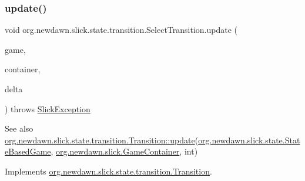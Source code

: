 \mbox{\label{classorg_1_1newdawn_1_1slick_1_1state_1_1transition_1_1_select_transition_a17304499adede77a5323e747aee6bcdd}} 
\subsubsection{\texorpdfstring{update()}{update()}}
{\footnotesize\ttfamily void org.\+newdawn.\+slick.\+state.\+transition.\+Select\+Transition.\+update (\begin{DoxyParamCaption}\item[{\mbox{\hyperlink{classorg_1_1newdawn_1_1slick_1_1state_1_1_state_based_game}{State\+Based\+Game}}}]{game,  }\item[{\mbox{\hyperlink{classorg_1_1newdawn_1_1slick_1_1_game_container}{Game\+Container}}}]{container,  }\item[{int}]{delta }\end{DoxyParamCaption}) throws \mbox{\hyperlink{classorg_1_1newdawn_1_1slick_1_1_slick_exception}{Slick\+Exception}}\hspace{0.3cm}{\ttfamily [inline]}}

\begin{DoxySeeAlso}{See also}
\mbox{\hyperlink{interfaceorg_1_1newdawn_1_1slick_1_1state_1_1transition_1_1_transition_a9be3072f6e2423e3d0a451a419d1d518}{org.\+newdawn.\+slick.\+state.\+transition.\+Transition\+::update}}(\mbox{\hyperlink{classorg_1_1newdawn_1_1slick_1_1state_1_1_state_based_game}{org.\+newdawn.\+slick.\+state.\+State\+Based\+Game}}, \mbox{\hyperlink{classorg_1_1newdawn_1_1slick_1_1_game_container}{org.\+newdawn.\+slick.\+Game\+Container}}, int) 
\end{DoxySeeAlso}


Implements \mbox{\hyperlink{interfaceorg_1_1newdawn_1_1slick_1_1state_1_1transition_1_1_transition_a9be3072f6e2423e3d0a451a419d1d518}{org.\+newdawn.\+slick.\+state.\+transition.\+Transition}}.


